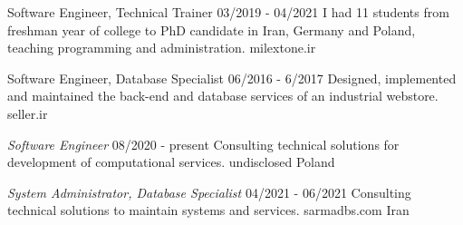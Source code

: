 \documentclass[a4paper,12pt]{memoir} %
\begin{document}
{Software Engineer, Technical Trainer}
{03/2019 - 04/2021}
{I had 11 students from freshman year of college to PhD candidate in Iran, Germany and Poland, teaching programming and administration.}
{milextone.ir}


{Software Engineer, Database Specialist}
{06/2016 - 6/2017}
{Designed, implemented and maintained the back-end and database services of an industrial webstore.}
{seller.ir}


\Sep %




{\textit{Software Engineer}}
{08/2020 - present}
{Consulting technical solutions for development of computational services.}
{undisclosed}
{Poland}


{\textit{System Administrator, Database Specialist}}
{04/2021 - 06/2021}
{Consulting technical solutions to maintain systems and services.}
{sarmadbs.com}
{Iran}


\Sep %





\end{document}

